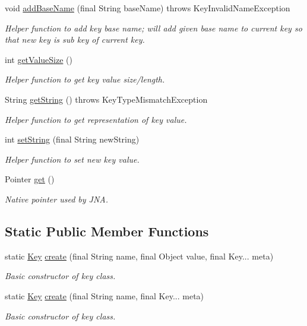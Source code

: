 \begin{DoxyCompactItemize}
void \hyperlink{classorg_1_1libelektra_1_1Key_a07a939d44265c7b017104f3f37e9ca16}{add\+Base\+Name} (final String base\+Name)  throws Key\+Invalid\+Name\+Exception 	
\begin{DoxyCompactList}\small\item\em Helper function to add key base name; will add given base name to current key so that new key is sub key of current key. \end{DoxyCompactList}\item 
int \hyperlink{classorg_1_1libelektra_1_1Key_aeb1c3e899a17778c8511a08ee0472e43}{get\+Value\+Size} ()
\begin{DoxyCompactList}\small\item\em Helper function to get key value size/length. \end{DoxyCompactList}\item 
String \hyperlink{classorg_1_1libelektra_1_1Key_a3464485c19d49b6763f6c831cf5ed06c}{get\+String} ()  throws Key\+Type\+Mismatch\+Exception 	
\begin{DoxyCompactList}\small\item\em Helper function to get representation of key value. \end{DoxyCompactList}\item 
int \hyperlink{classorg_1_1libelektra_1_1Key_a5ccfaddf110c47c83686655a694ee76d}{set\+String} (final String new\+String)
\begin{DoxyCompactList}\small\item\em Helper function to set new key value. \end{DoxyCompactList}\item 
Pointer \hyperlink{classorg_1_1libelektra_1_1Key_a3c65267ac3d24c3eae35db576414fe4f}{get} ()
\begin{DoxyCompactList}\small\item\em Native pointer used by J\+NA. \end{DoxyCompactList}\end{DoxyCompactItemize}
\subsection*{Static Public Member Functions}
\begin{DoxyCompactItemize}
\item 
static \hyperlink{classorg_1_1libelektra_1_1Key}{Key} \hyperlink{classorg_1_1libelektra_1_1Key_a785f6b8e937d51575a4acc2ebc8f19a2}{create} (final String name, final Object value, final Key... meta)
\begin{DoxyCompactList}\small\item\em Basic constructor of key class. \end{DoxyCompactList}\item 
static \hyperlink{classorg_1_1libelektra_1_1Key}{Key} \hyperlink{classorg_1_1libelektra_1_1Key_a77ab77c48bcb237724581d914abbd7fe}{create} (final String name, final Key... meta)
\begin{DoxyCompactList}\small\item\em Basic constructor of key class. \end{DoxyCompactList}\end{DoxyCompactItemize}
